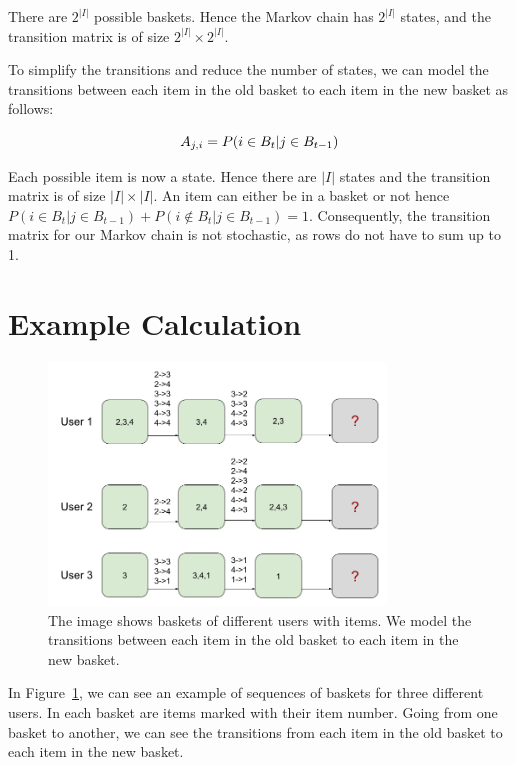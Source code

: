 There are $2^{|I|}$ possible baskets. Hence the Markov chain has $2^{|I|}$ states, and the transition matrix is of size $2^{|I|}\times2^{|I|}$. 

To simplify the transitions and reduce the number of states, we can model the transitions between each item in the old basket to each item in the new basket as follows:

\begin{equation}
\setlength{\jot}{25pt}
    A_{j,i}=P(i\in B_t |j\in B_{t-1})
    \label{equation:simplified_markov_chain}
\end{equation}

Each possible item is now a state. Hence there are $|I|$ states and the transition matrix is of size $|I|\times|I|$. An item can either be in a basket or not hence $P(i\in B_t |j\in B_{t-1})+P(i\not\in B_t |j\in B_{t-1})=1$. Consequently, the transition matrix for our Markov chain is not stochastic, as rows do not have to sum up to 1.

\section{Example Calculation}

\begin{figure}[htbp]
\centering
\includegraphics[width=0.8\textwidth]{images/illustrations/markov_chains_recommendations.png}
\caption{The image shows baskets of different users with items. We model the transitions between each item in the old basket to each item in the new basket.}
\label{fig:markov_chains_for_recommendations}
\end{figure}

In Figure~\ref{fig:markov_chains_for_recommendations}, we can see an example of sequences of baskets for three different users. In each basket are items marked with their item number. Going from one basket to another, we can see the transitions from each item in the old basket to each item in the new basket. 


